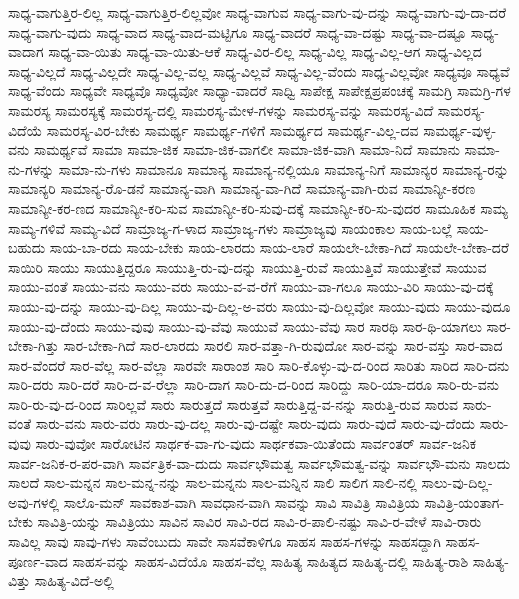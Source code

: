 {ಸಾಧ್ಯ-ವಾಗುತ್ತಿರ-ಲಿಲ್ಲ
ಸಾಧ್ಯ-ವಾಗುತ್ತಿರ-ಲಿಲ್ಲವೋ
ಸಾಧ್ಯ-ವಾಗುವ
ಸಾಧ್ಯ-ವಾಗು-ವು-ದನ್ನು
ಸಾಧ್ಯ-ವಾಗು-ವು-ದಾ-ದರೆ
ಸಾಧ್ಯ-ವಾಗು-ವುದು
ಸಾಧ್ಯ-ವಾದ
ಸಾಧ್ಯ-ವಾದ-ಮಟ್ಟಿಗೂ
ಸಾಧ್ಯ-ವಾದರೆ
ಸಾಧ್ಯ-ವಾ-ದಷ್ಟು
ಸಾಧ್ಯ-ವಾ-ದಷ್ಟೂ
ಸಾಧ್ಯ-ವಾದಾಗ
ಸಾಧ್ಯ-ವಾ-ಯಿತು
ಸಾಧ್ಯ-ವಾ-ಯಿತು-ಆಕೆ
ಸಾಧ್ಯ-ವಿರ-ಲಿಲ್ಲ
ಸಾಧ್ಯ-ವಿಲ್ಲ
ಸಾಧ್ಯ-ವಿಲ್ಲ-ಆಗ
ಸಾಧ್ಯ-ವಿಲ್ಲದ
ಸಾಧ್ಯ-ವಿಲ್ಲದೆ
ಸಾಧ್ಯ-ವಿಲ್ಲದೇ
ಸಾಧ್ಯ-ವಿಲ್ಲ-ವಲ್ಲ
ಸಾಧ್ಯ-ವಿಲ್ಲವೆ
ಸಾಧ್ಯ-ವಿಲ್ಲ-ವೆಂದು
ಸಾಧ್ಯ-ವಿಲ್ಲವೋ
ಸಾಧ್ಯವೂ
ಸಾಧ್ಯವೆ
ಸಾಧ್ಯ-ವೆಂದು
ಸಾಧ್ಯವೇ
ಸಾಧ್ಯವೊ
ಸಾಧ್ಯವೋ
ಸಾಧ್ಯಾ-ವಾದರೆ
ಸಾಧ್ವಿ
ಸಾಪೇಕ್ಷ
ಸಾಪೇಕ್ಷಪ್ರಪಂಚಕ್ಕೆ
ಸಾಮಗ್ರಿ
ಸಾಮಗ್ರಿ-ಗಳ
ಸಾಮರಸ್ಯ
ಸಾಮರಸ್ಯಕ್ಕೆ
ಸಾಮರಸ್ಯ-ದಲ್ಲಿ
ಸಾಮರಸ್ಯ-ಮೇಳ-ಗಳನ್ನು
ಸಾಮರಸ್ಯ-ವನ್ನು
ಸಾಮರಸ್ಯ-ವಿದೆ
ಸಾಮರಸ್ಯ-ವಿದೆಯೆ
ಸಾಮರಸ್ಯ-ವಿರ-ಬೇಕು
ಸಾಮರ್ಥ್ಯ
ಸಾಮರ್ಥ್ಯ-ಗಳಿಗೆ
ಸಾಮರ್ಥ್ಯದ
ಸಾಮರ್ಥ್ಯ-ವಿಲ್ಲ-ದವ
ಸಾಮರ್ಥ್ಯ-ವುಳ್ಳ-ವನು
ಸಾಮರ್ಥ್ಯವೆ
ಸಾಮಾ
ಸಾಮಾ-ಜಿಕ
ಸಾಮಾ-ಜಿಕ-ವಾಗಲೀ
ಸಾಮಾ-ಜಿಕ-ವಾಗಿ
ಸಾಮಾ-ನಿದೆ
ಸಾಮಾನು
ಸಾಮಾ-ನು-ಗಳನ್ನು
ಸಾಮಾ-ನು-ಗಳು
ಸಾಮಾನೂ
ಸಾಮಾನ್ಯ
ಸಾಮಾನ್ಯ-ನಲ್ಲಿಯೂ
ಸಾಮಾನ್ಯ-ನಿಗೆ
ಸಾಮಾನ್ಯರ
ಸಾಮಾನ್ಯ-ರನ್ನು
ಸಾಮಾನ್ಯರಿ
ಸಾಮಾನ್ಯ-ರೊ-ಡನೆ
ಸಾಮಾನ್ಯ-ವಾಗಿ
ಸಾಮಾನ್ಯ-ವಾ-ಗಿದೆ
ಸಾಮಾನ್ಯ-ವಾಗಿ-ರುವ
ಸಾಮಾನ್ಯೀ-ಕರಣ
ಸಾಮಾನ್ಯೀ-ಕರ-ಣದ
ಸಾಮಾನ್ಯೀ-ಕರಿ-ಸುವ
ಸಾಮಾನ್ಯೀ-ಕರಿ-ಸುವು-ದಕ್ಕೆ
ಸಾಮಾನ್ಯೀ-ಕರಿ-ಸು-ವುದರ
ಸಾಮೂಹಿಕ
ಸಾಮ್ಯ
ಸಾಮ್ಯ-ಗಳಿವೆ
ಸಾಮ್ಯ-ವಿದೆ
ಸಾಮ್ರಾಜ್ಯ-ಗ-ಳಾದ
ಸಾಮ್ರಾಜ್ಯ-ಗಳು
ಸಾಮ್ರಾಜ್ಯವು
ಸಾಯಂಕಾಲ
ಸಾಯ-ಬಲ್ಲೆ
ಸಾಯ-ಬಹುದು
ಸಾಯ-ಬಾ-ರದು
ಸಾಯ-ಬೇಕು
ಸಾಯ-ಲಾರದು
ಸಾಯ-ಲಾರೆ
ಸಾಯಲೇ-ಬೇಕಾ-ಗಿದೆ
ಸಾಯಲೇ-ಬೇಕಾ-ದರೆ
ಸಾಯಿರಿ
ಸಾಯು
ಸಾಯುತ್ತಿದ್ದರೂ
ಸಾಯುತ್ತಿ-ರು-ವು-ದನ್ನು
ಸಾಯುತ್ತಿ-ರುವೆ
ಸಾಯುತ್ತಿವೆ
ಸಾಯುತ್ತೇವೆ
ಸಾಯುವ
ಸಾಯು-ವಂತೆ
ಸಾಯು-ವನು
ಸಾಯು-ವರು
ಸಾಯು-ವ-ವ-ರೆಗೆ
ಸಾಯು-ವಾ-ಗಲೂ
ಸಾಯು-ವಿರಿ
ಸಾಯು-ವು-ದಕ್ಕೆ
ಸಾಯು-ವು-ದನ್ನು
ಸಾಯು-ವು-ದಿಲ್ಲ
ಸಾಯು-ವು-ದಿಲ್ಲ-ಅ-ವರು
ಸಾಯು-ವು-ದಿಲ್ಲವೋ
ಸಾಯು-ವುದು
ಸಾಯು-ವುದೂ
ಸಾಯು-ವು-ದೆಂದು
ಸಾಯು-ವುವು
ಸಾಯು-ವು-ವೆವು
ಸಾಯುವೆ
ಸಾಯು-ವೆವು
ಸಾರ
ಸಾರಥಿ
ಸಾರ-ಥಿ-ಯಾಗಲು
ಸಾರ-ಬೇಕಾ-ಗಿತ್ತು
ಸಾರ-ಬೇಕಾ-ಗಿದೆ
ಸಾರ-ಲಾರದು
ಸಾರಲಿ
ಸಾರ-ವತ್ತಾ-ಗಿ-ರುವುದೋ
ಸಾರ-ವನ್ನು
ಸಾರ-ವಸ್ತು
ಸಾರ-ವಾದ
ಸಾರ-ವೆಂದರೆ
ಸಾರ-ವೆಲ್ಲ
ಸಾರ-ವೆಲ್ಲಾ
ಸಾರವೇ
ಸಾರಾಂಶ
ಸಾರಿ
ಸಾರಿ-ಕೊಳ್ಳು-ವು-ದ-ರಿಂದ
ಸಾರಿತು
ಸಾರಿದ
ಸಾರಿ-ದನು
ಸಾರಿ-ದರು
ಸಾರಿ-ದರೆ
ಸಾರಿ-ದ-ವ-ರೆಲ್ಲಾ
ಸಾರಿ-ದಾಗ
ಸಾರಿ-ದು-ದ-ರಿಂದ
ಸಾರಿದ್ದು
ಸಾರಿ-ಯಾ-ದರೂ
ಸಾರಿ-ರು-ವನು
ಸಾರಿ-ರು-ವು-ದ-ರಿಂದ
ಸಾರಿಲ್ಲವೆ
ಸಾರು
ಸಾರುತ್ತದೆ
ಸಾರುತ್ತವೆ
ಸಾರುತ್ತಿದ್ದ-ವ-ನನ್ನು
ಸಾರುತ್ತಿ-ರುವ
ಸಾರುವ
ಸಾರು-ವಂತೆ
ಸಾರು-ವನು
ಸಾರು-ವರು
ಸಾರು-ವು-ದಲ್ಲ
ಸಾರು-ವು-ದಷ್ಟೇ
ಸಾರು-ವುದು
ಸಾರು-ವುದೆ
ಸಾರು-ವು-ದೆಂದು
ಸಾರು-ವುವು
ಸಾರು-ವುವೋ
ಸಾರೋಟಿನ
ಸಾರ್ಥಕ-ವಾ-ಗು-ವುದು
ಸಾರ್ಥಕವಾ-ಯಿತೆಂದು
ಸಾರ್ವಂತರ್
ಸಾರ್ವ-ಜನಿಕ
ಸಾರ್ವ-ಜನಿಕ-ರ-ಪರ-ವಾಗಿ
ಸಾರ್ವತ್ರಿಕ-ವಾ-ದುದು
ಸಾರ್ವಭೌಮತ್ವ
ಸಾರ್ವಭೌಮತ್ವ-ವನ್ನು
ಸಾರ್ವಭೌ-ಮನು
ಸಾಲದು
ಸಾಲದೆ
ಸಾಲ-ಮನ್ನನ
ಸಾಲ-ಮನ್ನ-ನನ್ನು
ಸಾಲ-ಮನ್ನನು
ಸಾಲ-ಮನ್ನಿನ
ಸಾಲಿ
ಸಾಲಿಗ
ಸಾಲಿ-ನಲ್ಲಿ
ಸಾಲು-ವು-ದಿಲ್ಲ-ಅವು-ಗಳಲ್ಲಿ
ಸಾಲೊ-ಮನ್
ಸಾವಕಾಶ-ವಾಗಿ
ಸಾವಧಾನ-ವಾಗಿ
ಸಾವನ್ನು
ಸಾವಿ
ಸಾವಿತ್ರಿ
ಸಾವಿತ್ರಿಯ
ಸಾವಿತ್ರಿ-ಯಂತಾಗ-ಬೇಕು
ಸಾವಿತ್ರಿ-ಯನ್ನು
ಸಾವಿತ್ರಿಯು
ಸಾವಿನ
ಸಾವಿರ
ಸಾವಿ-ರದ
ಸಾವಿ-ರ-ಪಾಲಿ-ನಷ್ಟು
ಸಾವಿ-ರ-ವೇಳೆ
ಸಾವಿ-ರಾರು
ಸಾವಿಲ್ಲ
ಸಾವು
ಸಾವು-ಗಳು
ಸಾವೆಂಬುದು
ಸಾವೇ
ಸಾಸವೆಕಾಳಿಗೂ
ಸಾಹಸ
ಸಾಹಸ-ಗಳನ್ನು
ಸಾಹಸದ್ದಾಗಿ
ಸಾಹಸ-ಪೂರ್ಣ-ವಾದ
ಸಾಹಸ-ವನ್ನು
ಸಾಹಸ-ವಿದೆಯೊ
ಸಾಹಸ-ವೆಲ್ಲ
ಸಾಹಿತ್ಯ
ಸಾಹಿತ್ಯದ
ಸಾಹಿತ್ಯ-ದಲ್ಲಿ
ಸಾಹಿತ್ಯ-ರಾಶಿ
ಸಾಹಿತ್ಯ-ವಿತ್ತು
ಸಾಹಿತ್ಯ-ವಿದೆ-ಅಲ್ಲಿ
}
